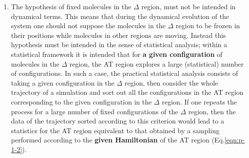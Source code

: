 \documentclass[aip,jcp,a4paper,reprint,onecolumn]{revtex4-1}
\newcommand{\HY}{{\Delta}}
\begin{document}
\begin{enumerate}
\item The hypothesis of fixed molecules in the $\HY$ region, must not be intended in dynamical terms. This means that during the dynamical evolution of the system one should not suppose the molecules in the $\HY$ region to be frozen in their positions while molecules in other regions are moving. Instead this hypothesis must be intended in the sense of statistical analysis; within a statistical framework it is intended that for {\bf a given configuration} of molecules in the $\HY$ region, the AT region explores a large (statistical) number of configurations. In such a case, the practical statistical analysis consists of taking a given configuration in the $\HY$ region, then consider the whole trajectory of a simulation and sort out all the configurations in the AT region corresponding to the given configuration in the $\HY$ region. If one repeats the process for a large number of fixed configurations of the $\HY$ region, then the data of the trajectory sorted according to this criterion would lead to a statistics for the AT region equivalent to that obtained by a sampling performed according to the {\bf given Hamiltonian} of the AT region (Eq.\ref{eqn:p-1-2}).

\end{enumerate}
\end{document}
